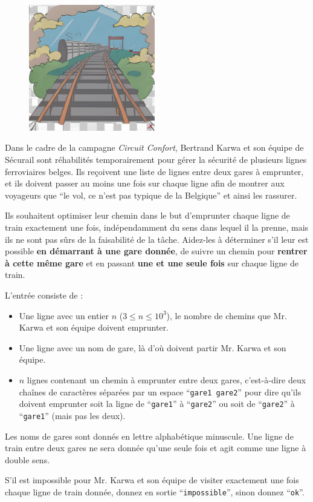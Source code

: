 \problemname{\problemyamlname}

\begin{figure}
	\centering
	\includegraphics[width=5.5cm]{railway.jpg}
\end{figure}
Dans le cadre de la campagne \emph{Circuit Confort}, Bertrand Karwa et son équipe de Sécurail sont réhabilités
temporairement pour gérer la sécurité de plusieurs lignes ferroviaires belges. Ils reçoivent une liste de lignes
entre deux gares à emprunter, et ils doivent passer au moins une fois sur chaque ligne afin de montrer aux
voyageurs que ``le vol, ce n'est pas typique de la Belgique'' et ainsi les rassurer.

Ils souhaitent optimiser leur chemin dans le but d'emprunter chaque ligne de train exactement une fois, indépendamment du sens dans lequel il la prenne, mais ils ne sont pas sûrs
de la faisabilité de la tâche. Aidez-les à déterminer s'il leur est possible \textbf{en démarrant à une gare donnée}, de suivre un chemin pour \textbf{rentrer à cette même gare} et en passant \textbf{une et une seule fois} sur chaque ligne de train.

\begin{Input}
	L'entrée consiste de :
	\begin{itemize}
		\item Une ligne avec un entier $n$ ($3 \le n \le 10^3$), le nombre de chemins que Mr. Karwa et son équipe doivent emprunter.
		\item Une ligne avec un nom de gare, là d'où doivent partir Mr. Karwa et son équipe.
		\item $n$ lignes contenant un chemin à emprunter entre deux gares, c'est-à-dire deux chaînes de caractères séparées par un espace ``\verb|gare1 gare2|'' pour dire qu'ils doivent emprunter soit la ligne de ``\verb|gare1|'' à ``\verb|gare2|'' ou soit de ``\verb|gare2|'' à ``\verb|gare1|'' (mais pas les deux).
	\end{itemize}
	Les noms de gares sont donnés en lettre alphabétique minuscule.
	Une ligne de train entre deux gares ne sera donnée qu'une seule fois et agit comme une ligne à double sens.
\end{Input}

\begin{Output}
	S'il est impossible pour Mr. Karwa et son équipe de visiter exactement une fois chaque ligne de train donnée, donnez en sortie ``\verb|impossible|'', sinon donnez ``\verb|ok|''.
\end{Output}
